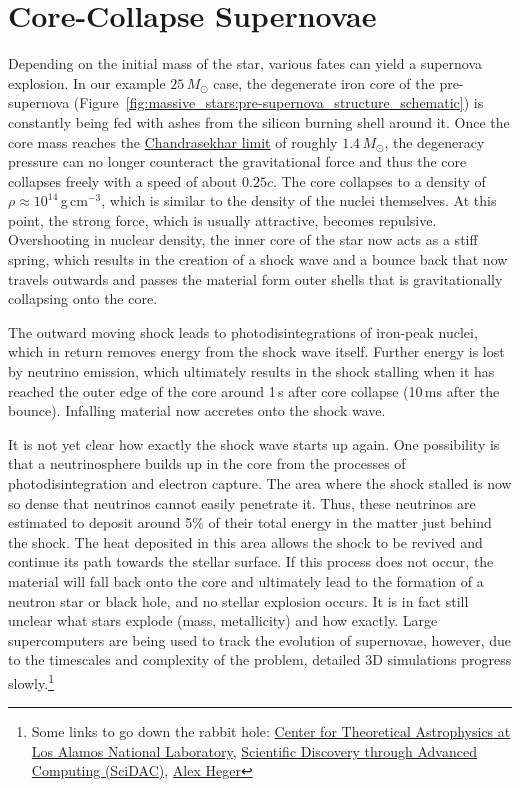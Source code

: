 \section{Core-Collapse Supernovae}

Depending on the initial mass of the star, various fates can yield a supernova explosion. In our example $25\,M_\odot$ case, the degenerate iron core of the pre-supernova (Figure~\ref{fig:massive_stars:pre-supernova_structure_schematic}) is constantly being fed with ashes from the silicon burning shell around it. Once the core mass reaches the \href{https://en.wikipedia.org/wiki/Chandrasekhar_limit}{Chandrasekhar limit} of roughly $1.4\,M_\odot$, the degeneracy pressure can no longer counteract the gravitational force and thus the core collapses freely with a speed of about $0.25c$. The core collapses to a density of $\rho\approx10^{14}$\,g\,cm$^{-3}$, which is similar to the density of the nuclei themselves. At this point, the strong force, which is usually attractive, becomes repulsive. Overshooting in nuclear density, the inner core of the star now acts as a stiff spring, which results in the creation of a shock wave and a bounce back that now travels outwards and passes the material form outer shells that is gravitationally collapsing onto the core. 

The outward moving shock leads to photodisintegrations of iron-peak nuclei, which in return removes energy from the shock wave itself. Further energy is lost by neutrino emission, which ultimately results in the shock stalling when it has reached the outer edge of the core around 1\,s after core collapse (10\,ms after the bounce). Infalling material now accretes onto the shock wave.

It is not yet clear how exactly the shock wave starts up again. One possibility is that a neutrinosphere builds up in the core from the processes of photodisintegration and electron capture. The area where the shock stalled is now so dense that neutrinos cannot easily penetrate it. Thus, these neutrinos are estimated to deposit around 5\% of their total energy in the matter just behind the shock. The heat deposited in this area allows the shock to be revived and continue its path towards the stellar surface. If this process does not occur, the material will fall back onto the core and ultimately lead to the formation of a neutron star or black hole, and no stellar explosion occurs. It is in fact still unclear what stars explode (mass, metallicity) and how exactly. Large supercomputers are being used to track the evolution of supernovae, however, due to the timescales and complexity of the problem, detailed 3D simulations progress slowly.\footnote{Some links to go down the rabbit hole: \href{https://ccsweb.lanl.gov/astro/index.html}{Center for Theoretical Astrophysics at Los Alamos National Laboratory}, \href{https://www.scidac.gov/}{Scientific Discovery through Advanced Computing (SciDAC)}, \href{https://2sn.org/}{Alex Heger}}

